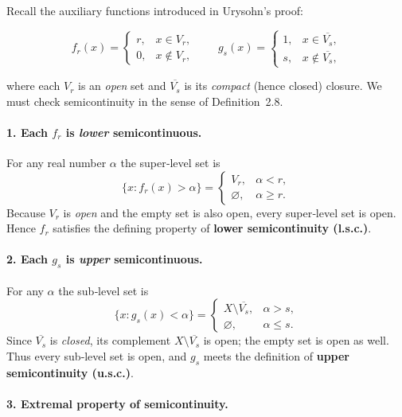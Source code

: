 \documentclass[12pt]{article}
\theoremstyle{definition} %
\theoremstyle{plain} %
\begin{document}
Recall the auxiliary functions introduced in Urysohn’s proof:

\[
  f_r(x)=
  \begin{cases}
      r, & x\in V_r,\\[2pt]
      0, & x\notin V_r,
  \end{cases}
  \qquad
  g_s(x)=
  \begin{cases}
      1, & x\in\overline{V_s},\\[2pt]
      s, & x\notin\overline{V_s},
  \end{cases}
  \tag{4}
\]

where each \(V_r\) is an \emph{open} set and \(\overline{V_s}\) is its
\emph{compact} (hence closed) closure.  
We must check semicontinuity in the sense of Definition~2.8.

\paragraph{1.  Each \(f_r\) is \emph{lower} semicontinuous.}

For any real number \(\alpha\) the super‐level set is
\[
  \{x : f_r(x) > \alpha\} =
  \begin{cases}
      V_r,          & \alpha<r,\\[4pt]
      \varnothing,  & \alpha\ge r.
  \end{cases}
\]
Because \(V_r\) is \emph{open} and the empty set is also open, every
super‐level set is open.  
Hence \(f_r\) satisfies the defining property of
\textbf{lower semicontinuity (l.s.c.)}.

\paragraph{2.  Each \(g_s\) is \emph{upper} semicontinuous.}

For any \(\alpha\) the sub‐level set is
\[
  \{x : g_s(x) < \alpha\} =
  \begin{cases}
      X\setminus \overline{V_s}, & \alpha> s,\\[4pt]
      \varnothing,               & \alpha\le s.
  \end{cases}
\]
Since \(\overline{V_s}\) is \emph{closed}, its complement
\(X\setminus\overline{V_s}\) is open; the empty set is open as well.
Thus every sub‐level set is open, and \(g_s\) meets the definition of
\textbf{upper semicontinuity (u.s.c.)}.

\paragraph{3.  Extremal property of semicontinuity.}
\end{document}
